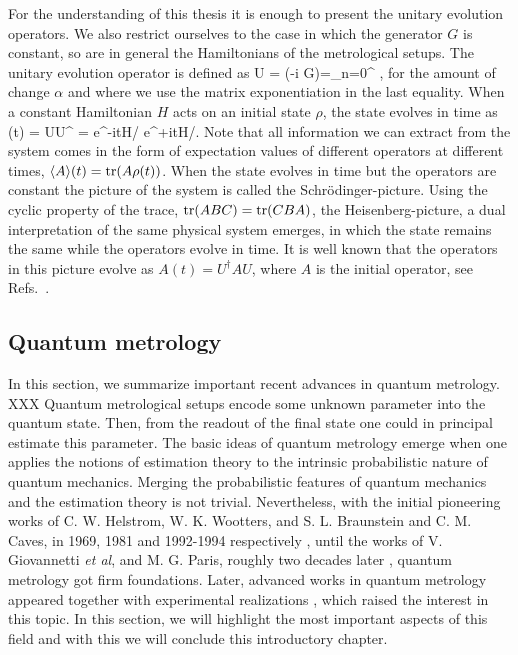 For the understanding of this thesis it is enough to present the unitary evolution operators.
We also restrict ourselves to the case in which the generator $G$ is constant, so are in general the Hamiltonians of the metrological setups.
The unitary evolution operator is defined as
\be
  U = \exp(-i \alpha G)=\sum_{n=0}^{\infty} ,
\ee
for the amount of change $\alpha$ and where we use the matrix exponentiation in the last equality.
When a constant Hamiltonian $H$ acts on an initial state $\rho$, the state evolves in time as
\be
  \rho(t) = U\rho U^{\dagger} = e^{-itH/\hbar} \rho e^{+itH/\hbar}.
\ee
Note that all information we can extract from the system comes in the form of expectation values of different operators at different times, $\langle{A}\rangle(t) = \operatorname{tr}(A\rho(t))$.
When the state evolves in time but the operators are constant the picture of the system is called the Schr\"odinger-picture.
Using the cyclic property of the trace, $\operatorname{tr}(ABC) = \operatorname{tr}(CBA)$, the Heisenberg-picture, a dual interpretation of the same physical system emerges, in which the state remains the same while the operators evolve in time.
It is well known that the operators in this picture evolve as $A(t) = U^{\dagger} A U$, where $A$ is the initial operator, see Refs.~\cite{Cohen-Tannoudji1977, Sakurai2010}.

\subsection{Quantum metrology}
\label{sec:bg-quantum-metrology}

In this section, we summarize important recent advances in quantum metrology.
XXX Quantum metrological setups encode some unknown parameter into the quantum state.
Then, from the readout of the final state one could in principal estimate this parameter.
The basic ideas of quantum metrology emerge when one applies the notions of estimation theory to the intrinsic probabilistic nature of quantum mechanics.
Merging the probabilistic features of quantum mechanics and the estimation theory is not trivial.
Nevertheless, with the initial pioneering works of C. W. Helstrom, W. K. Wootters, and S. L. Braunstein and C. M. Caves, in 1969, 1981 and 1992-1994 respectively \cite{Helstrom1969, Wootters1981, Braunstein1992, Braunstein1994}, until the works of V. Giovannetti {\it et al}, and M. G. Paris, roughly two decades later \cite{Giovannetti2004, Paris2009}, quantum metrology got firm foundations.
Later, advanced works in quantum metrology appeared \cite{Hyllus2010, Hyllus2012, Hyllus2010a, Kolodynski2010, Kolodynski2013}
together with experimental realizations \cite{Behbood2013, Koschorreck2011, Luecke2011}, which raised the interest in this topic.
In this section, we will highlight the most important aspects of this field and with this we will conclude this introductory chapter.

